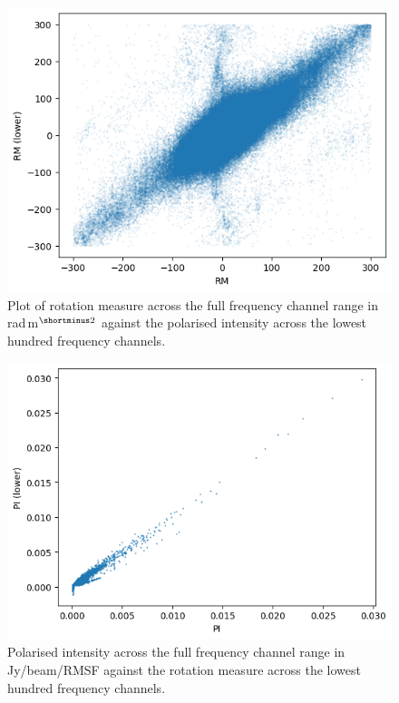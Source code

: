 \begin{figure}
    \centering
    \includegraphics[width=1\linewidth]{Thesis_Template/Figures/RM_vs_lower.png}
    \caption{Plot of rotation measure across the full frequency channel range in rad$\,$m$^{\shortminus2}$ against the polarised intensity across the lowest hundred frequency channels.}
    \label{fig: rm vs lower}
\end{figure}

\begin{figure}
    \centering
    \includegraphics[width=1\linewidth]{Thesis_Template/Figures/PI_vs_lower.png}
    \caption{Polarised intensity across the full frequency channel range in Jy/beam/RMSF 
    against the rotation measure across the lowest hundred frequency channels.}
    \label{fig: pi vs lower}
\end{figure}

